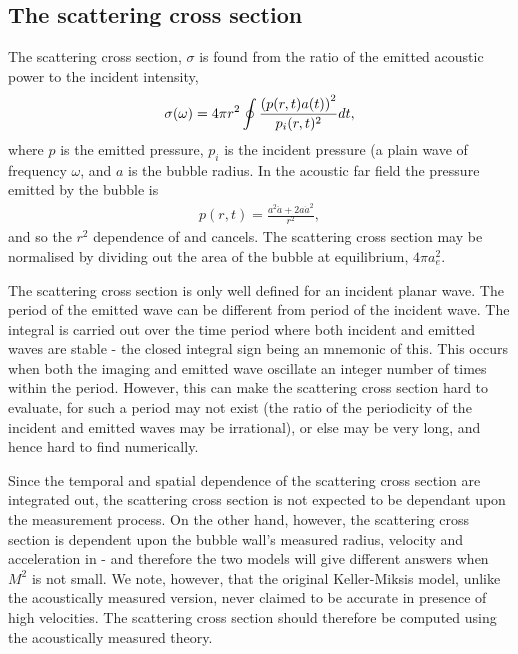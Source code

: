 \subsection{ The scattering cross section}\label{sec:measurement:scatteringxs}
The scattering cross section, $\sigma$ is found from the ratio of the  emitted acoustic power to the incident intensity, \cite{ShutilovBook}
\begin{align}
  \sigma(\omega) = 4\pi r^2 \oint \frac{ \left( p(r, t) a(t) \right)^2}{p_i(r,t)^2} dt,\label{eqn:sigmaff}
\end{align}
where $p$ is the emitted pressure, $p_i$ is the incident pressure (a plain wave of frequency $\omega$, and $a$ is the bubble radius.
In the acoustic far field the pressure emitted by the bubble\cite{Howe2003} is 
\begin{align}
p(r, t) =  \frac{a^2 \ddot a+  2a {\dot a}^2}{r^2}, \label{eqn:pff}
\end{align}
and so the $r^2$ dependence of  and  cancels.
The scattering cross section may be normalised by dividing out the area of the bubble at equilibrium, $4\pi a_e^2$.


The scattering cross section is only well defined for an incident planar wave.
The period of the emitted wave can be different from period of the incident wave.
The integral is carried out over the
time period where both incident and emitted waves are stable - the closed integral sign being an mnemonic of this.
This occurs when both the imaging and emitted wave oscillate an integer number of times within the period.
However, this can make the scattering cross section hard to evaluate, 
for such a period may not exist (the ratio of the periodicity of the incident and emitted waves may be irrational),
or else may be very long, and hence hard to find numerically.


Since the temporal and spatial dependence of the scattering cross section are integrated out,
the scattering cross section is not expected to be dependant upon the measurement process.
On the other hand, however,
the scattering cross section is dependent upon the bubble wall's measured radius, velocity and acceleration
in  -
and therefore the two models will give different answers when $M^2$ is not small.
We note, however, that the original Keller-Miksis model, unlike the acoustically measured version,
never claimed to be accurate in presence of high velocities.
The scattering cross section should therefore be computed using the acoustically measured theory.


